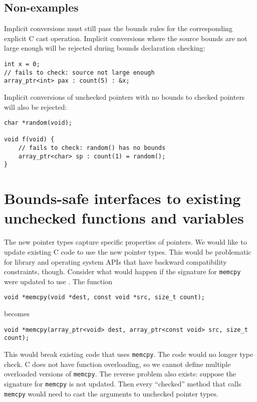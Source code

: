 \subsection{Non-examples}

Implicit conversions must still pass the bounds rules for the corresponding explicit
C cast operation.  Implicit conversions where the source bounds are not large
enough will be rejected during bounds declaration checking:
\begin{verbatim}
int x = 0;
// fails to check: source not large enough
array_ptr<int> pax : count(5) : &x;
\end{verbatim}

Implicit conversions of unchecked pointers with no bounds to checked pointers
will also be rejected:
\begin{verbatim}
char *random(void);

void f(void) {
    // fails to check: random() has no bounds
    array_ptr<char> sp : count(1) = random(); 
}
\end{verbatim}

\section{Bounds-safe interfaces to existing unchecked functions and variables}
\label{section:function-bounds-safe-interfaces}

The new pointer types capture specific properties of pointers. We would like to update
existing C code to use the new pointer types. This would be problematic for library and operating
system APIs that have backward  compatibility constraints, though.   Consider what would happen
if the signature for \texttt{memcpy} were updated to use \arrayptr. The function

\begin{verbatim}
void *memcpy(void *dest, const void *src, size_t count);
\end{verbatim}

becomes

\begin{verbatim}
void *memcpy(array_ptr<void> dest, array_ptr<const void> src, size_t count);
\end{verbatim}

This would break existing code that uses \texttt{memcpy}.  The code would no longer type check.
C does not have function overloading, so we cannot define multiple overloaded versions of
\texttt{memcpy}.  The reverse problem also exists: suppose the signature for \texttt{memcpy} is
not updated. Then every ``checked'' method that calls \texttt{memcpy} would need to cast
the arguments to unchecked pointer types.


